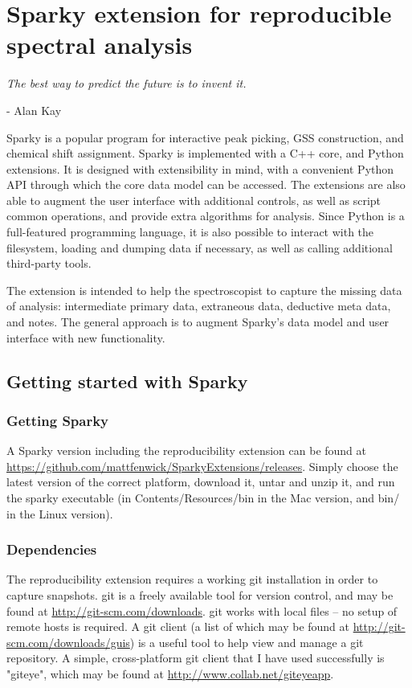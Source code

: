 \chapter{Sparky extension for reproducible spectral analysis}
\label{sec_sparky_extension}

\begin{center}
  \textit{The best way to predict the future is to invent it.}

 - Alan Kay
\end{center}


Sparky \cite{sparky} is a popular program for interactive peak picking,
GSS construction, and chemical shift assignment.  Sparky is implemented 
with a C++ core, and Python extensions.  It is designed with
extensibility in mind, with a convenient Python API through which 
the core data model can be accessed.  The
extensions are also able to augment the user interface with additional
controls, as well as script common operations, and provide extra algorithms
for analysis.  Since Python is a full-featured programming language, 
it is also possible to interact with the filesystem, loading and dumping
data if necessary, as well as calling additional third-party tools.

The extension is intended to help the spectroscopist to capture the 
missing data of analysis: intermediate primary data, extraneous
data, deductive meta data, and notes.  The general approach is to augment
Sparky's data model and user interface with new functionality.



\section{Getting started with Sparky}

\subsection{Getting Sparky}
A Sparky version including the reproducibility extension can be found at
\url{https://github.com/mattfenwick/SparkyExtensions/releases}.  Simply 
choose the latest version of the correct platform, download it, untar and 
unzip it, and run the sparky executable (in Contents/Resources/bin in the
Mac version, and bin/ in the Linux version).

\subsection{Dependencies}
The reproducibility extension requires a working git installation in order
to capture snapshots.  git is a freely available tool for version control,
and may be found at \url{http://git-scm.com/downloads}.
git works with local files -- no setup of remote hosts is required.
A git client (a list of which may be found at \url{http://git-scm.com/downloads/guis})
is a useful tool to help view and manage a git repository.  A simple,
cross-platform git client that I have used successfully is "giteye",
which may be found at \url{http://www.collab.net/giteyeapp}.


